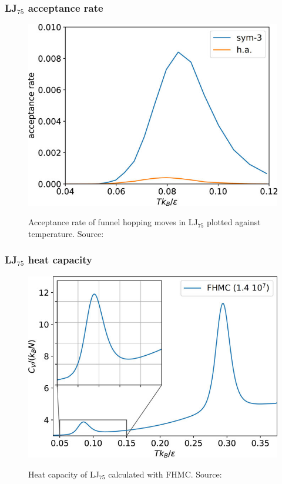 \documentclass{beamer}
\begin{document}
 	\begin{frame}
 		\frametitle{LJ$_{75}$ acceptance rate}
 		\begin{figure}
			\center
			\includegraphics[height=0.85\textheight]{figures/LJ75_acc.jpg}
			\label{fig:LJ38_acc}
			\caption{Acceptance rate of funnel hopping moves in LJ$_{75}$ plotted against temperature. Source: \cite{Finkler2020}}
		\end{figure}
 	\end{frame}

 	\begin{frame}
 		\frametitle{LJ$_{75}$ heat capacity}
 		\begin{figure}
			\center
			\includegraphics[height=0.85\textheight]{figures/LJ75_Cv.png}
			\label{fig:LJ75_Cv}
			\caption{Heat capacity of LJ$_{75}$ calculated with FHMC. Source: \cite{Finkler2020}}
		\end{figure}
 	\end{frame}
\end{document}
